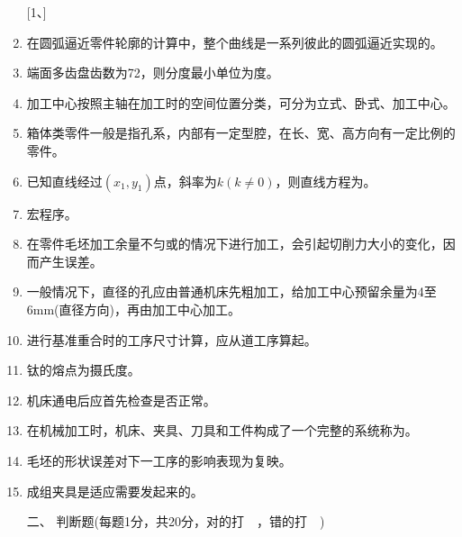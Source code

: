\documentclass[12pt,twocolumn,landscape,UTF8,twoside]{ctexart}
\begin{document}
\begin{spacing}{1.089}
\begin{enumerate} [1、]
%
\item 在圆弧逼近零件轮廓的计算中，整个曲线是一系列彼此的圆弧逼近实现的。
%
\item 端面多齿盘齿数为72，则分度最小单位为度。
%
\item 加工中心按照主轴在加工时的空间位置分类，可分为立式、卧式、加工中心。
%
\item 箱体类零件一般是指孔系，内部有一定型腔，在长、宽、高方向有一定比例的零件。
%
\item 已知直线经过$(x_1,y_1)$点，斜率为$k(k≠0)$，则直线方程为。
%
\item 宏程序。
%
\item 在零件毛坯加工余量不匀或的情况下进行加工，会引起切削力大小的变化，因而产生误差。
%
\item 一般情况下，直径的孔应由普通机床先粗加工，给加工中心预留余量为4至6mm(直径方向)，再由加工中心加工。
%
\item 进行基准重合时的工序尺寸计算，应从道工序算起。
%
\item  钛的熔点为摄氏度。
%
\item 机床通电后应首先检查是否正常。
%
\item 在机械加工时，机床、夹具、刀具和工件构成了一个完整的系统称为。
%
\item 毛坯的形状误差对下一工序的影响表现为复映。
%
\item 成组夹具是适应需要发起来的。


\item[\heiti 二、] { \heiti 判断题(每题1分，共20分，对的打~{\Checkmark}~，错的打~{\XSolid}~)}


\end{enumerate}
\end{spacing}
\end{document}
